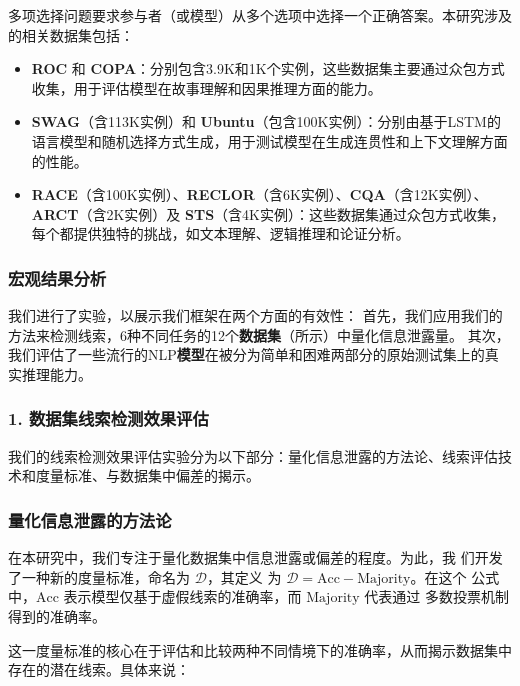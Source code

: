 多项选择问题要求参与者（或模型）从多个选项中选择一个正确答案。本研究涉及的相关数据集包括：
\begin{itemize}
    \item \textbf{ROC}\cite{mostafazadeh2016corpus} 
    和 \textbf{COPA}\cite{roemmele2011choice}：分别包含3.9K和1K个实例，这些数据集主要通过众包方式收集，用于评估模型在故事理解和因果推理方面的能力。
    \item \textbf{SWAG}（含113K实例）和 \textbf{Ubuntu}\cite{lowe2015ubuntu}（包含100K实例）：分别由基于LSTM的语言模型和随机选择方式生成，用于测试模型在生成连贯性和上下文理解方面的性能。
    \item \textbf{RACE}\cite{lai2017race}（含100K实例）、\textbf{RECLOR}\cite{yu2020reclor}（含6K实例）、\textbf{CQA}（含12K实例）、
    \textbf{ARCT}\cite{habernal2018argument}（含2K实例）及 \textbf{STS}（含4K实例）：这些数据集通过众包方式收集，每个都提供独特的挑战，如文本理解、逻辑推理和论证分析。
\end{itemize}

\subsubsection{宏观结果分析}
\label{sec4:experiment1}
我们进行了实验，以展示我们框架在两个方面的有效性：
首先，我们应用我们的方法来检测线索，6种不同任务的12个\textbf{数据集}（所示）中量化信息泄露量。
其次，我们评估了一些流行的NLP\textbf{模型}在被分为简单和困难两部分的原始测试集上的真实推理能力。

\subsubsection*{1. 数据集线索检测效果评估}
我们的线索检测效果评估实验分为以下部分：量化信息泄露的方法论、线索评估技术和度量标准、与数据集中偏差的揭示。
\subsubsection*{量化信息泄露的方法论}

在本研究中，我们专注于量化数据集中信息泄露或偏差的程度。为此，我
们开发了一种新的度量标准，命名为 $\mathcal{D}$，其定义
为 $\mathcal{D} = \text{Acc} - \text{Majority}$。在这个
公式中，$\text{Acc}$ 表示模型仅基于虚假线索的准确率，而 $\text{Majority}$ 代表通过
多数投票机制得到的准确率。

这一度量标准的核心在于评估和比较两种不同情境下的准确率，从而揭示数据集中
存在的潜在线索。具体来说：

